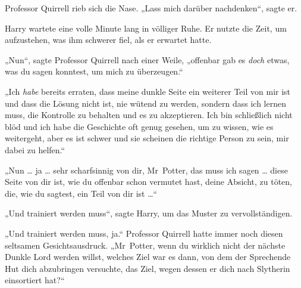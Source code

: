Professor Quirrell rieb sich die Nase.
„Lass mich darüber nachdenken“, sagte er.

Harry wartete eine volle Minute lang in völliger Ruhe. Er nutzte die Zeit, um aufzustehen, was ihm schwerer fiel, als er erwartet hatte.

„Nun“, sagte Professor Quirrell nach einer Weile, „offenbar gab es \emph{doch} etwas, was du sagen konntest, um mich zu überzeugen.“

„Ich \emph{habe} bereits erraten, dass meine dunkle Seite ein weiterer Teil von mir ist und dass die Lösung nicht ist, nie wütend zu werden, sondern dass ich lernen muss, die Kontrolle zu behalten und es zu akzeptieren. Ich bin schließlich nicht blöd und ich habe die Geschichte oft genug gesehen, um zu wissen, wie es weitergeht, aber es ist schwer und sie scheinen die richtige Person zu sein, mir dabei zu helfen.“

„Nun … ja … sehr scharfsinnig von dir, Mr~Potter, das muss ich sagen … diese Seite von dir ist, wie du offenbar schon vermutet hast, deine Absicht, zu töten, die, wie du sagtest, ein Teil von dir ist …“

„Und trainiert werden muss“, sagte Harry, um das Muster zu vervollständigen.

„Und trainiert werden muss, ja.“ Professor Quirrell hatte immer noch diesen seltsamen Gesichtsausdruck.
„Mr~Potter, wenn du wirklich nicht der nächste Dunkle Lord werden willst, welches Ziel war es dann, von dem der Sprechende Hut dich abzubringen versuchte, das Ziel, wegen dessen er dich nach Slytherin einsortiert hat?“

